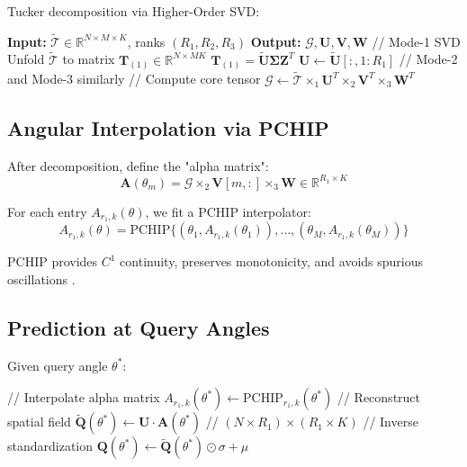 \documentclass[conference]{IEEEtran}
\begin{document}
Tucker decomposition via Higher-Order SVD:

\begin{algorithmic}
\STATE \textbf{Input:} $\tilde{\mathcal{T}} \in \mathbb{R}^{N \times M \times K}$, ranks $(R_1, R_2, R_3)$
\STATE \textbf{Output:} $\mathcal{G}, \mathbf{U}, \mathbf{V}, \mathbf{W}$
\STATE
\STATE // Mode-1 SVD
\STATE Unfold $\tilde{\mathcal{T}}$ to matrix $\mathbf{T}_{(1)} \in \mathbb{R}^{N \times MK}$
\STATE $\mathbf{T}_{(1)} = \tilde{\mathbf{U}} \mathbf{\Sigma} \mathbf{Z}^T$
\STATE $\mathbf{U} \leftarrow \tilde{\mathbf{U}}[:, 1:R_1]$
\STATE
\STATE // Mode-2 and Mode-3 similarly
\STATE
\STATE // Compute core tensor
\STATE $\mathcal{G} \leftarrow \tilde{\mathcal{T}} \times_1 \mathbf{U}^T \times_2 \mathbf{V}^T \times_3 \mathbf{W}^T$
\end{algorithmic}

\subsection{Angular Interpolation via PCHIP}

After decomposition, define the "alpha matrix":
\begin{equation}
\mathbf{A}(\theta_m) = \mathcal{G} \times_2 \mathbf{V}[m,:] \times_3 \mathbf{W} \in \mathbb{R}^{R_1 \times K}
\end{equation}

For each entry $A_{r_1,k}(\theta)$, we fit a PCHIP interpolator:
\begin{equation}
A_{r_1,k}(\theta) = \text{PCHIP}\{(\theta_1, A_{r_1,k}(\theta_1)), \ldots, (\theta_M, A_{r_1,k}(\theta_M))\}
\end{equation}

PCHIP provides $C^1$ continuity, preserves monotonicity, and avoids spurious oscillations \cite{fritsch1980}.

\subsection{Prediction at Query Angles}

Given query angle $\theta^*$:

\begin{algorithmic}
\STATE // Interpolate alpha matrix
        \STATE $A_{r_1,k}(\theta^*) \leftarrow \text{PCHIP}_{r_1,k}(\theta^*)$
    \ENDFOR
\ENDFOR
\STATE
\STATE // Reconstruct spatial field
\STATE $\tilde{\mathbf{Q}}(\theta^*) \leftarrow \mathbf{U} \cdot \mathbf{A}(\theta^*)$ \quad // $(N \times R_1) \times (R_1 \times K)$
\STATE
\STATE // Inverse standardization
\STATE $\mathbf{Q}(\theta^*) \leftarrow \tilde{\mathbf{Q}}(\theta^*) \odot \sigma + \mu$
\end{algorithmic}
\end{document}

